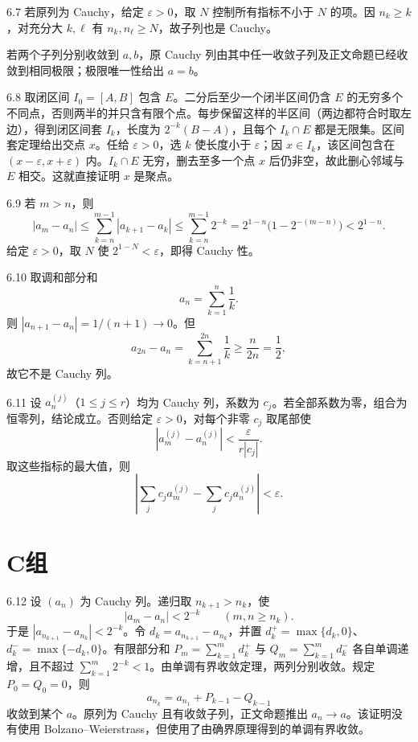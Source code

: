 \begin{solution}{6.7}
若原列为 Cauchy，给定 \(\varepsilon>0\)，取 \(N\) 控制所有指标不小于 \(N\) 的项。因 \(n_k\ge k\)，对充分大 \(k,\ell\) 有 \(n_k,n_\ell\ge N\)，故子列也是 Cauchy。

若两个子列分别收敛到 \(a,b\)，原 Cauchy 列由其中任一收敛子列及正文命题已经收敛到相同极限；极限唯一性给出 \(a=b\)。
\end{solution}

\begin{solution}{6.8}
取闭区间 \(I_0=[A,B]\) 包含 \(E\)。二分后至少一个闭半区间仍含 \(E\) 的无穷多个不同点，否则两半的并只含有限个点。每步保留这样的半区间（两边都符合时取左边），得到闭区间套 \(I_k\)，长度为 \(2^{-k}(B-A)\)，且每个 \(I_k\cap E\) 都是无限集。区间套定理给出交点 \(x\)。任给 \(\varepsilon>0\)，选 \(k\) 使长度小于 \(\varepsilon\)；因 \(x\in I_k\)，该区间包含在 \((x-\varepsilon,x+\varepsilon)\) 内。\(I_k\cap E\) 无穷，删去至多一个点 \(x\) 后仍非空，故此删心邻域与 \(E\) 相交。这就直接证明 \(x\) 是聚点。
\end{solution}

\begin{solution}{6.9}
若 \(m>n\)，则
\[
 |a_m-a_n|\le\sum_{k=n}^{m-1}|a_{k+1}-a_k|
 \le\sum_{k=n}^{m-1}2^{-k}
 =2^{1-n}\bigl(1-2^{-(m-n)}\bigr)<2^{1-n}.
\]
给定 \(\varepsilon>0\)，取 \(N\) 使 \(2^{1-N}<\varepsilon\)，即得 Cauchy 性。
\end{solution}

\begin{solution}{6.10}
取调和部分和
\[
 a_n=\sum_{k=1}^n\frac1k.
\]
则 \(|a_{n+1}-a_n|=1/(n+1)\to0\)。但
\[
 a_{2n}-a_n=\sum_{k=n+1}^{2n}\frac1k\ge\frac n{2n}=\frac12,
\]
故它不是 Cauchy 列。
\end{solution}

\begin{solution}{6.11}
设 \(a^{(j)}_n\)（\(1\le j\le r\)）均为 Cauchy 列，系数为 \(c_j\)。若全部系数为零，组合为恒零列，结论成立。否则给定 \(\varepsilon>0\)，对每个非零 \(c_j\) 取尾部使
\[
 |a^{(j)}_m-a^{(j)}_n|<\frac{\varepsilon}{r|c_j|}.
\]
取这些指标的最大值，则
\[
 \left|\sum_jc_ja^{(j)}_m-\sum_jc_ja^{(j)}_n\right|<\varepsilon.
\]
\end{solution}

\section*{C组}

\begin{solution}{6.12}
设 \((a_n)\) 为 Cauchy 列。递归取 \(n_{k+1}>n_k\)，使
\[
 |a_m-a_n|<2^{-k}\qquad(m,n\ge n_k).
\]
于是 \(|a_{n_{k+1}}-a_{n_k}|<2^{-k}\)。令 \(d_k=a_{n_{k+1}}-a_{n_k}\)，并置 \(d_k^+=\max\{d_k,0\}\)、\(d_k^-=\max\{-d_k,0\}\)。有限部分和 \(P_m=\sum_{k=1}^m d_k^+\) 与 \(Q_m=\sum_{k=1}^m d_k^-\) 各自单调递增，且不超过 \(\sum_{k=1}^m2^{-k}<1\)。由单调有界收敛定理，两列分别收敛。规定 \(P_0=Q_0=0\)，则
\[
 a_{n_k}=a_{n_1}+P_{k-1}-Q_{k-1}
\]
收敛到某个 \(a\)。原列为 Cauchy 且有收敛子列，正文命题推出 \(a_n\to a\)。该证明没有使用 Bolzano--Weierstrass，但使用了由确界原理得到的单调有界收敛。
\end{solution}

